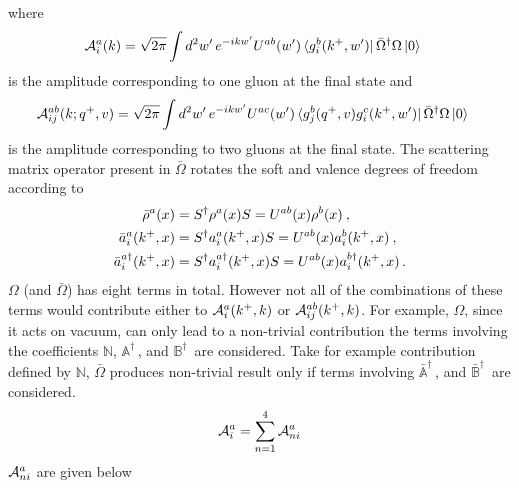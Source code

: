 \documentclass[aps,prd,amsmath,amssymb,nofootinbib]{revtex4-2}
\def\mf#1{\mathbb{#1}}
\numberwithin{equation}{section}
\begin{document}
where \begin{align}
    {\cal A}^{a}_{i}(k) & = \sqrt{2\pi} \int d^{2}w^\prime\,e^{-ikw^\prime} U^{ab}(w^\prime)\bra{g^{b}_{i}(k^{+},w^\prime)}\Bar{\Omega}^{\dagger}\Omega\ket{0}
\end{align}
is the amplitude corresponding to one gluon at the final state and 
\begin{align}
     {\cal A}^{ab}_{ij}(k; q^+, v) & = \sqrt{2\pi} \int d^{2} w^{\prime}\,  e^{-ikw^\prime} U^{ac}(w^\prime)\bra{g^{b}_{j}(q^{+},v)g^{c}_{i}(k^{+},w^\prime)}\Bar{\Omega}^{\dagger}\Omega\ket{0}
\end{align}
 is the amplitude corresponding to two gluons at the final state. 
The scattering matrix operator present in $\bar \Omega$ rotates the soft and valence degrees of freedom according to  
\begin{align}
    \bar \rho^a(x)  &= S^\dagger  \rho^a(x) S 
    = U^{a b}(x)  \rho^b(x) \:, \notag  \\ 
    \bar a_i^a(k^+, x)  &= S^\dagger a_i^{a}(k^+,x) S 
    = U^{a b}(x)  a_i^b(k^+,x) \:, \notag  \\
    \bar a_i^{a\dagger}(k^+,x)  &= S^\dagger a_i^{a\dagger}(k^+,x) S 
    = U^{a b}(x)  a_i^{b\dagger}(k^+, x) \,. 
\end{align}
$\Omega$ (and $\bar \Omega$) has eight terms in total. 
However not all of the combinations of these terms would contribute either to  $  {\cal A}_i^a (k^+, k) $ or ${\cal A}^{ab}_{ij}(k^{+},k)$.  For example, $\Omega$, since it acts on vacuum, can only lead to a non-trivial contribution the terms involving the coefficients $\mf{N}$, $\mf{A}^\dagger\,$, and $\mf{B}^\dagger\,$ are considered.  
Take for example contribution defined by $\mf{N}$, $\bar \Omega$ produces non-trivial result only if terms involving $\bar {\mf{A}}^\dagger\,$, and $\bar {\mf{B}}^\dagger\,$ are considered. 
\begin{align}
    {\cal A}^{a}_i = \sum_{n=1}^4 {\cal A}^{a}_{n i} 
\end{align}
${\cal A}^{a}_{n i}$ are given below  
\end{document}

